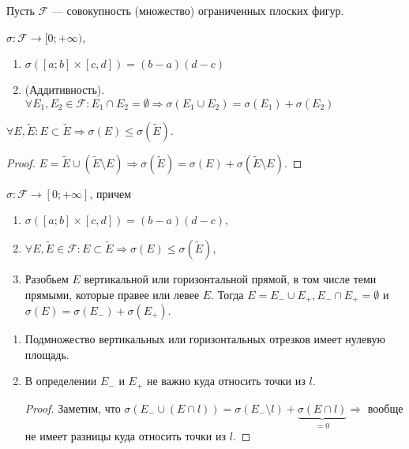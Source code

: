 Пусть $\mathcal{F}$ --- совокупность (множество) ограниченных плоских фигур. 
\begin{definition}
    $\sigma\!: \mathcal{F} \to [0; +\infty)$, 
     \begin{enumerate}
         \item $\sigma([a; b] \times [c, d]) = (b - a)(d - c)$
         \item (Аддитивность).  $\forall E_1, E_2 \in \mathcal{F}\!: E_1 \cap E_2 = \emptyset \Rightarrow \sigma(E_1 \cup E_2) = \sigma(E_1) + \sigma(E_2)$
    \end{enumerate}
\end{definition}
\begin{property}
    $\forall E, \widetilde{E}\!: E \subset \widetilde{E} \Rightarrow \sigma(E) \le \sigma(\widetilde{E})$.
\end{property}
\begin{proof}
    $E = \widetilde{E} \cup (\widetilde{E} \setminus E) \Rightarrow \sigma(\widetilde{E}) = \sigma(E) + \sigma(\widetilde{E} \setminus E)$.
\end{proof}
\begin{definition}
    $\sigma\!: \mathcal{F} \to [0; +\infty]$, причем
     \begin{enumerate}
         \item $\sigma([a; b] \times [c, d]) = (b - a)(d - c)$,
         \item $\forall E, \widetilde{E} \in \mathcal{F}\!: E \subset \widetilde{E} \Rightarrow \sigma(E) \le \sigma(\widetilde{E})$, 
         \item Разобьем $E$ вертикальной или горизонтальной прямой, в том числе теми прямыми, которые правее или левее $E$. Тогда  $E = E_- \cup E_+, E_- \cap E_+ = \emptyset$ и  $\sigma(E) = \sigma(E_-) + \sigma(E_+)$.
    \end{enumerate}
\end{definition}
\begin{properties}
    \begin{enumerate}
        \item Подмножество вертикальных или горизонтальных отрезков имеет нулевую площадь.
        \item В определении $E_-$ и  $E_+$ не важно  куда относить точки из  $l$.
            \begin{proof}
                Заметим, что $\sigma(E_- \cup (E \cap l)) = \sigma(E_- \setminus l) + \underbrace{\sigma(E \cap l)}_{=0} \Rightarrow$ вообще не имеет разницы куда относить точки из  $l$.
            \end{proof}
    \end{enumerate}
\end{properties}
